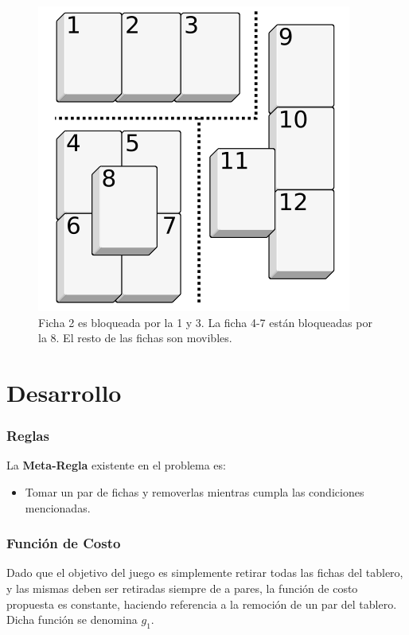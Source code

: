 \documentclass{beamer}
\begin{document}
\begin{frame}
\begin{figure}[hb]
  	\includegraphics[scale=0.3]{../images/blocking.png}
	\caption{Ficha 2 es bloqueada por la 1 y 3. La ficha 4-7 est\'an bloqueadas por la 8. El resto de las fichas son movibles.}
  \label{fig:blocking}
\end{figure}
\end{frame}

\section{Desarrollo}

\begin{frame}
  \frametitle{Reglas}   %
	La \textbf{Meta-Regla} existente en el problema es:
	\begin{itemize}
		\item Tomar un par de fichas y removerlas mientras cumpla las condiciones mencionadas.
	\end{itemize}
\end{frame}

\begin{frame}
  	\frametitle{Funci\'on de Costo}   %
	Dado que el objetivo del juego es simplemente retirar todas las fichas del tablero, y las mismas deben ser retiradas siempre de a pares, la funci\'on de costo propuesta es constante, haciendo referencia a la remoci\'on de un par del tablero. Dicha funci\'on se denomina \textit{$g_1$}. \\
\end{frame}
\end{document}
